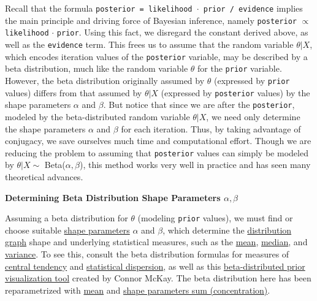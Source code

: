 Recall that the formula \texttt{posterior = likelihood $\cdot$ prior / evidence} implies the main principle and driving force of Bayesian inference, namely \texttt{posterior} $\propto$ \texttt{likelihood} $\cdot$ \texttt{prior}. Using this fact, we disregard the constant derived above, as well as the \texttt{evidence} term. This frees us to assume that the random variable $\theta|X$, which encodes iteration values of the \texttt{posterior} variable, may be described by a beta distribution, much like the random variable $\theta$ for the \texttt{prior} variable. However, the beta distribution originally assumed by $\theta$ (expressed by \texttt{prior} values) differs from that assumed by $\theta|X$ (expressed by \texttt{posterior} values) by the shape parameters $\alpha$ and $\beta$. But notice that since we are after the \texttt{posterior}, modeled by the beta-distributed random variable $\theta|X$, we need only determine the shape parameters $\alpha$ and $\beta$ for each iteration. Thus, by taking advantage of conjugacy, we save ourselves much time and computational effort. Though we are reducing the problem to assuming that \texttt{posterior} values can simply be modeled by $\theta|X \sim$ Beta($\alpha, \beta$), this method works very well in practice and has seen many theoretical advances.

\textbf{Determining Beta Distribution Shape Parameters $\alpha, \beta$}

Assuming a beta distribution for $\theta$ (modeling \texttt{prior} values), we must find or choose suitable \href{https://en.wikipedia.org/wiki/Shape_parameter}{shape parameters} $\alpha$ and $\beta$, which determine the \href{https://en.wikipedia.org/wiki/Probability_distribution}{distribution graph} shape and underlying statistical measures, such as the \href{https://en.wikipedia.org/wiki/Expected_value}{mean}, \href{https://en.wikipedia.org/wiki/Median}{median}, and \href{https://en.wikipedia.org/wiki/Variance}{variance}. To see this, consult the beta distribution formulas for measures of \href{https://en.wikipedia.org/wiki/Beta_distribution#Measures_of_central_tendency}{central tendency} and \href{https://en.wikipedia.org/wiki/Beta_distribution#Measures_of_statistical_dispersion}{statistical dispersion}, as well as this \href{http://ctmckay.me/bayesian-explorer/}{beta-distributed prior visualization tool} created by Connor McKay. The beta distribution here has been reparametrized with \href{https://en.wikipedia.org/wiki/Beta_distribution#Mean}{mean} and \href{https://en.wikipedia.org/wiki/Beta_distribution#Mean_and_sample_size}{shape parameters sum (concentration)}.

